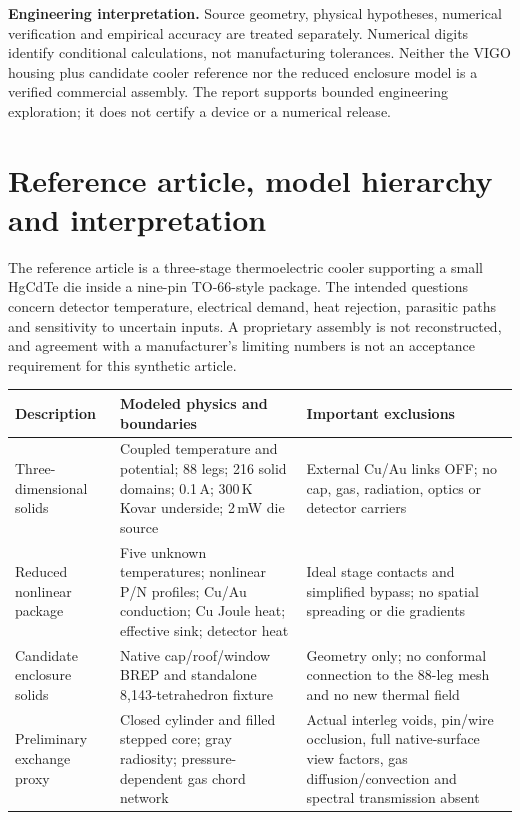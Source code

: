 \documentclass[11pt,a4paper]{article}
\begin{document}
\textbf{Engineering interpretation.} Source geometry, physical hypotheses, numerical verification and empirical accuracy are treated separately. Numerical digits identify conditional calculations, not manufacturing tolerances. Neither the VIGO housing plus candidate cooler reference nor the reduced enclosure model is a verified commercial assembly. The report supports bounded engineering exploration; it does not certify a device or a numerical release.
\clearpage
\tableofcontents
\clearpage
\section{Reference article, model hierarchy and interpretation}
The reference article is a three-stage thermoelectric cooler supporting a small HgCdTe die inside a nine-pin TO-66-style package. The intended questions concern detector temperature, electrical demand, heat rejection, parasitic paths and sensitivity to uncertain inputs. A proprietary assembly is not reconstructed, and agreement with a manufacturer's limiting numbers is not an acceptance requirement for this synthetic article.

\begin{tabularx}{\linewidth}{p{29mm}XX}\toprule
Description & Modeled physics and boundaries & Important exclusions\\\midrule
Three-dimensional solids & Coupled temperature and potential; 88 legs; 216 solid domains; 0.1\,A; 300\,K Kovar underside; 2\,mW die source & External Cu/Au links OFF; no cap, gas, radiation, optics or detector carriers\\
Reduced nonlinear package & Five unknown temperatures; nonlinear P/N profiles; Cu/Au conduction; Cu Joule heat; effective sink; detector heat & Ideal stage contacts and simplified bypass; no spatial spreading or die gradients\\
Candidate enclosure solids & Native cap/roof/window BREP and standalone 8,143-tetrahedron fixture & Geometry only; no conformal connection to the 88-leg mesh and no new thermal field\\
Preliminary exchange proxy & Closed cylinder and filled stepped core; gray radiosity; pressure-dependent gas chord network & Actual interleg voids, pin/wire occlusion, full native-surface view factors, gas diffusion/convection and spectral transmission absent\\\bottomrule
\end{tabularx}
\end{document}
